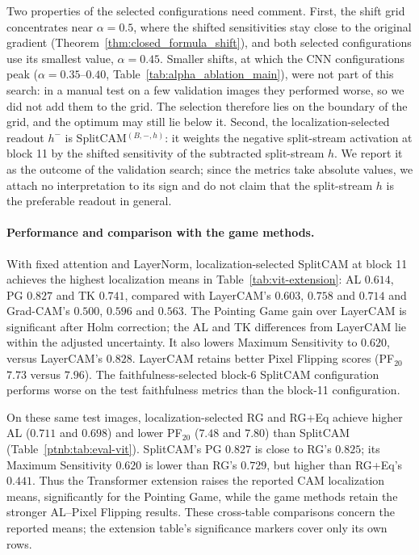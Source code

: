 Two properties of the selected configurations need comment. First, the shift grid concentrates near $\alpha=0.5$, where the shifted sensitivities stay close to the original gradient (Theorem~\ref{thm:closed_formula_shift}), and both selected configurations use its smallest value, $\alpha=0.45$. Smaller shifts, at which the CNN configurations peak ($\alpha=0.35$--$0.40$, Table~\ref{tab:alpha_ablation_main}), were not part of this search: in a manual test on a few validation images they performed worse, so we did not add them to the grid. The selection therefore lies on the boundary of the grid, and the optimum may still lie below it. Second, the localization-selected readout $h^{-}$ is SplitCAM$^{(B,-,h)}$: it weights the negative split-stream activation at block 11 by the shifted sensitivity of the subtracted split-stream $h$. We report it as the outcome of the validation search; since the metrics take absolute values, we attach no interpretation to its sign and do not claim that the split-stream $h$ is the preferable readout in general.

\paragraph{Performance and comparison with the game methods.}
With fixed attention and LayerNorm, localization-selected SplitCAM at block 11 achieves the highest localization means in Table~\ref{tab:vit-extension}: AL $0.614$, PG $0.827$ and TK $0.741$, compared with LayerCAM's $0.603$, $0.758$ and $0.714$ and Grad-CAM's $0.500$, $0.596$ and $0.563$. The Pointing Game gain over LayerCAM is significant after Holm correction; the AL and TK differences from LayerCAM lie within the adjusted uncertainty. It also lowers Maximum Sensitivity to $0.620$, versus LayerCAM's $0.828$. LayerCAM retains better Pixel Flipping scores (PF$_{20}$ $7.73$ versus $7.96$). The faithfulness-selected block-6 SplitCAM configuration performs worse on the test faithfulness metrics than the block-11 configuration.

On these same test images, localization-selected RG and RG+Eq achieve higher AL ($0.711$ and $0.698$) and lower PF$_{20}$ ($7.48$ and $7.80$) than SplitCAM (Table~\ref{ptnb:tab:eval-vit}). SplitCAM's PG $0.827$ is close to RG's $0.825$; its Maximum Sensitivity $0.620$ is lower than RG's $0.729$, but higher than RG+Eq's $0.441$. Thus the Transformer extension raises the reported CAM localization means, significantly for the Pointing Game, while the game methods retain the stronger AL--Pixel Flipping results. These cross-table comparisons concern the reported means; the extension table's significance markers cover only its own rows.

